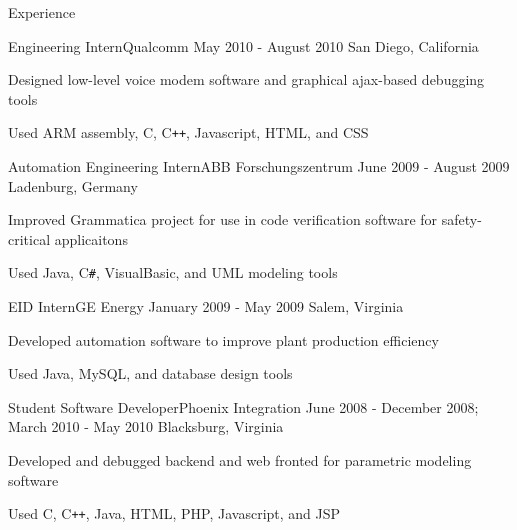 \documentclass{resume}
\begin{document}
\begin{section}{Experience}
		\begin{experience}{Engineering Intern}{Qualcomm}
		                  {May 2010 - August 2010}
		                  {San Diego, California}
			\item Designed low-level voice modem software and graphical ajax-based
			      debugging tools
			\item Used ARM assembly, C, C\texttt{++}, Javascript, HTML, and CSS
		\end{experience}

		\begin{experience}{Automation Engineering Intern}{ABB Forschungszentrum}
		                  {June 2009 - August 2009}
		                  {Ladenburg, Germany}
			\item Improved Grammatica project for use in code verification software
			      for safety-critical applicaitons
			\item Used Java, C\texttt{\#}, VisualBasic, and UML modeling tools
		\end{experience}

		\begin{experience}{EID Intern}{GE Energy}
		                  {January 2009 - May 2009}
		                  {Salem, Virginia}
			\item Developed automation software to improve plant production
			      efficiency
			\item Used Java, MySQL, and database design tools
		\end{experience}

		\begin{experience}{Student Software Developer}{Phoenix Integration}
		                  {June 2008 - December 2008; March 2010 - May 2010}
		                  {Blacksburg, Virginia}
			\item Developed and debugged backend and web fronted for parametric
			      modeling software
			\item Used C, C\texttt{++}, Java, HTML, PHP, Javascript, and JSP
		\end{experience}
	\end{section}
\end{document}
